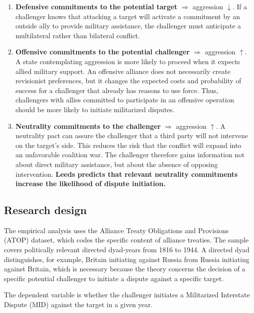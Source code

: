 \begin{enumerate}
    \item \textbf{Defensive commitments to the potential target} $\Rightarrow$ aggression $\downarrow$. If a challenger knows that attacking a target will activate a commitment by an outside ally to provide military assistance, the challenger must anticipate a multilateral rather than bilateral conflict.

    \item \textbf{Offensive commitments to the potential challenger} $\Rightarrow$ aggression $\uparrow$. A state contemplating aggression is more likely to proceed when it expects allied military support. An offensive alliance does not necessarily create revisionist preferences, but it changes the expected costs and probability of success for a challenger that already has reasons to use force. Thus, challengers with allies committed to participate in an offensive operation should be more likely to initiate militarized disputes.

    \item \textbf{Neutrality commitments to the challenger} $\Rightarrow$ aggression $\uparrow$. A neutrality pact can assure the challenger that a third party will not intervene on the target's side. This reduces the risk that the conflict will expand into an unfavorable coalition war. The challenger therefore gains information not about direct military assistance, but about the absence of opposing intervention. \textbf{Leeds predicts that relevant neutrality commitments increase the likelihood of dispute initiation.}
\end{enumerate}

\subsection{Research design}

The empirical analysis uses the Alliance Treaty Obligations and Provisions (ATOP) dataset, which codes the specific content of alliance treaties. The sample covers politically relevant directed dyad-years from 1816 to 1944. A directed dyad distinguishes, for example, Britain initiating against Russia from Russia initiating against Britain, which is necessary because the theory concerns the decision of a specific potential challenger to initiate a dispute against a specific target.

The dependent variable is whether the challenger initiates a Militarized Interstate Dispute (MID) against the target in a given year.

